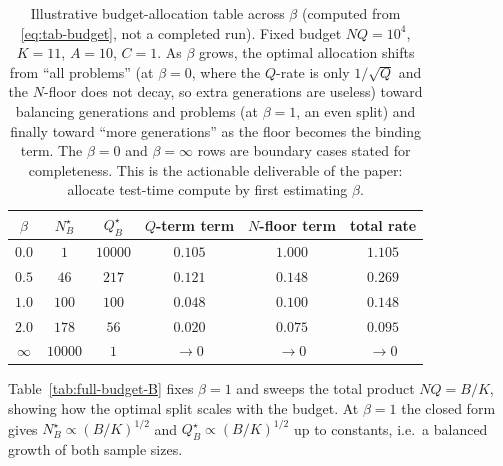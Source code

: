\documentclass{article} %
\begin{document}
\begin{table}[t]
\centering
\small
\begin{tabular}{cccccc}
\toprule
$\beta$ & $N_B^\star$ & $Q_B^\star$ & $Q$-term term & $N$-floor term & total rate \\
\midrule
$0.0$      & $1$    & $10000$ & $0.105$ & $1.000$ & $1.105$ \\
$0.5$      & $46$   & $217$   & $0.121$ & $0.148$ & $0.269$ \\
$1.0$      & $100$  & $100$   & $0.048$ & $0.100$ & $0.148$ \\
$2.0$      & $178$  & $56$    & $0.020$ & $0.075$ & $0.095$ \\
$\infty$   & $10000$ & $1$    & $\to 0$ & $\to 0$ & $\to 0$ \\
\bottomrule
\end{tabular}
\caption{Illustrative budget-allocation table across $\beta$
(computed from \eqref{eq:tab-budget}, not a completed run). Fixed budget
$NQ=10^4$, $K=11$, $A=10$, $C=1$. As $\beta$ grows, the optimal allocation
shifts from ``all problems'' (at $\beta=0$, where the $Q$-rate is only
$1/\sqrt Q$ and the $N$-floor does not decay, so extra generations are useless)
toward balancing generations and problems (at $\beta=1$, an even split) and
finally toward ``more generations'' as the floor becomes the binding term. The
$\beta=0$ and $\beta=\infty$ rows are boundary cases stated for completeness.
This is the actionable deliverable of the paper: allocate test-time compute by
first estimating $\beta$.}
\label{tab:full-budget-beta}
\end{table}

Table~\ref{tab:full-budget-B} fixes $\beta=1$ and sweeps the total product
$NQ=B/K$, showing how the optimal split scales with the budget. At $\beta=1$ the
closed form gives $N_B^\star\propto (B/K)^{1/2}$ and $Q_B^\star\propto
(B/K)^{1/2}$ up to constants, i.e.\ a balanced growth of both sample sizes.
\end{document}
